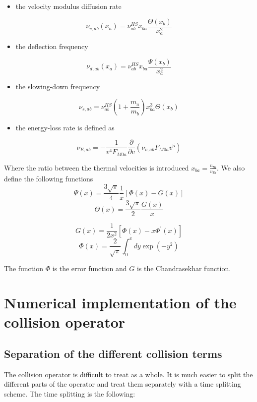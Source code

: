 \documentclass[11pt,preprint]{elsarticle}
\begin{document}
\begin{itemize}
\item the velocity modulus diffusion rate 
\end{itemize}
\[
\nu_{v,ab}\left(x_{a}\right)=\nu_{ab}^{HS}x_{ba}\frac{\Theta\left(x_{b}\right)}{x_{a}^{2}}
\]

\begin{itemize}
\item the deflection frequency 
\end{itemize}
\[
\nu_{d,ab}\left(x_{a}\right)=\nu_{ab}^{HS}x_{ba}\frac{\Psi\left(x_{b}\right)}{x_{a}^{2}}
\]

\begin{itemize}
\item the slowing-down frequency
\end{itemize}
\[
\nu_{s,ab}=\nu_{ab}^{HS}\left(1+\frac{m_{a}}{m_{b}}\right)x_{ba}^{3}\Theta(x_{b})
\]

\begin{itemize}
\item the energy-loss rate is defined as
\end{itemize}
\[
\nu_{E,ab}=-\frac{1}{v^{4}F_{M0a}}\frac{\partial}{\partial v}\left(\nu_{v,ab}F_{M0a}v^{5}\right)
\]


Where the ratio between the thermal velocities is introduced $x_{ba}=\frac{v_{Ta}}{v_{Tb}}$.
We also define the following functions
\[
\Psi\left(x\right)=\frac{3\sqrt{\pi}}{4}\frac{1}{x}\left[\Phi\left(x\right)-G\left(x\right)\right]
\]
\[
\Theta\left(x\right)=\frac{3\sqrt{\pi}}{2}\frac{G\left(x\right)}{x}
\]


\[
G\left(x\right)=\frac{1}{2x^{2}}\left[\Phi\left(x\right)-x\Phi^{'}\left(x\right)\right]
\]
\[
\Phi\left(x\right)=\frac{2}{\sqrt{\pi}}\int_{0}^{x}dy\exp\left(-y^{2}\right)
\]


The function $\Phi$ is the error function and $G$ is the Chandrasekhar
function. 

\section{Numerical implementation of the collision operator}


\subsection{Separation of the different collision terms}

The collision operator is difficult to treat as a whole. It is much easier to split the different parts of the operator and treat them separately with a time splitting scheme. The time splitting is the following:
\end{document}
